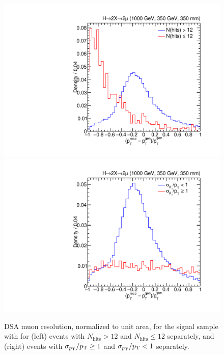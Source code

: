 \begin{figure}[htpb]
  \centering
  \includegraphics[width=\DSquareWidth]{figures/displaced/QCUTRES_Sig_pTRes_hits_1000_350_350.pdf}
  \hspace*{-2em}
  \includegraphics[width=\DSquareWidth]{figures/displaced/QCUTRES_Sig_pTRes_fpte_1000_350_350.pdf}
  \caption{DSA muon \pT resolution, normalized to unit area, for the \twoMu signal sample with  for (left) events with $N_\text{hits} > 12$ and $N_\text{hits} \leq 12$ separately, and (right) events with $\sigma_{p_{\mathrm{T}}}/p_{\mathrm{T}} \geq 1$ and $\sigma_{p_{\mathrm{T}}}/p_{\mathrm{T}} < 1$ separately.}
  \label{fig:dd:QCUT_PTRES}
\end{figure}
